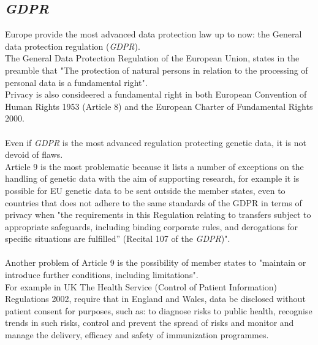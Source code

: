 \documentclass[12pt]{article}
\begin{document}
\subsection{\emph{GDPR}}
Europe provide the most advanced data protection law up to now: the General data protection regulation (\emph{GDPR}).\\
The General Data Protection Regulation of the European Union, states in the preamble that 
"The protection of natural persons in relation to the processing of personal data is a fundamental right".\\
Privacy is also consideered a fundamental right in both European Convention of Human Rights 1953 (Article 8) and the European Charter of Fundamental Rights 2000.\\
\\
Even if \emph{GDPR} is the most advanced regulation protecting genetic data, it is not devoid of flaws.\\
Article 9 is the most problematic because it lists a number of exceptions on the handling of genetic data with the aim of supporting research, 
for example it is possible for EU genetic data to be sent outside the member states, even to countries that does not adhere to the same standards of the GDPR in terms of privacy when 
"the requirements in this Regulation relating to transfers subject to appropriate safeguards, including binding corporate rules, 
and derogations for specific situations are fulfilled” (Recital 107 of the \emph{GDPR})"\cite{article9}.\\
\\
Another problem of Article 9 is the possibility of member states to "maintain or introduce further conditions, including limitations". \cite{article9}\\
For example in UK The Health Service (Control of Patient Information) Regulations 2002, require that in England and Wales, data be disclosed without patient consent for purposes, 
such as: to diagnose risks to public health, recognise trends in such risks, control and prevent the spread of risks and monitor and manage the delivery, 
efficacy and safety of immunization programmes. \cite{genetic_data_misuse}
\end{document}
